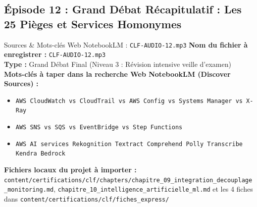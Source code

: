 \documentclass[11pt,a4paper]{article}
\begin{document}
\subsection{Épisode 12 : Grand Débat Récapitulatif : Les 25 Pièges et Services Homonymes}
\begin{sourcebox}{Sources \& Mots-clés Web NotebookLM : \texttt{CLF-AUDIO-12.mp3}}
\textbf{Nom du fichier à enregistrer :} \texttt{CLF-AUDIO-12.mp3}\\
\textbf{Type :} Grand Débat Final (Niveau 3 : Révision intensive veille d'examen)\\
\textbf{Mots-clés à taper dans la recherche Web NotebookLM (Discover Sources) :}
\begin{itemize}[noitemsep]
    \item \texttt{AWS CloudWatch vs CloudTrail vs AWS Config vs Systems Manager vs X-Ray}
    \item \texttt{AWS SNS vs SQS vs EventBridge vs Step Functions}
    \item \texttt{AWS AI services Rekognition Textract Comprehend Polly Transcribe Kendra Bedrock}
\end{itemize}
\textbf{Fichiers locaux du projet à importer :}
\texttt{content/certifications/clf/chapters/chapitre_09_integration_decouplage_monitoring.md}, \texttt{chapitre_10_intelligence_artificielle_ml.md} et les 4 fiches dans \texttt{content/certifications/clf/fiches_express/}
\end{sourcebox}
\end{document}
